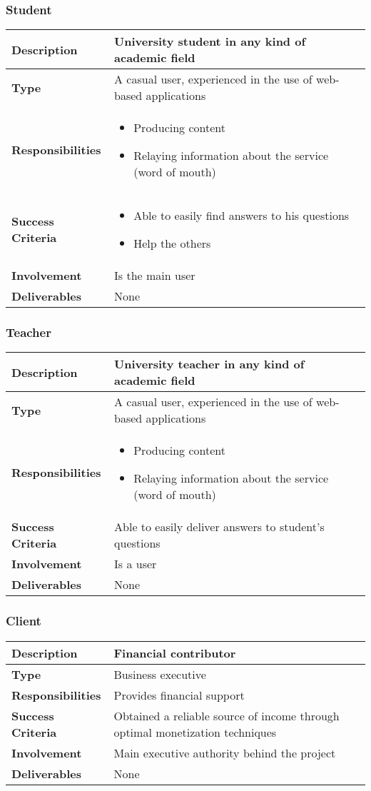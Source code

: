 \documentclass [a4paper, 11pt]{article}
\begin{document}
\subsubsection{Student}
\begin{tabular}{| >{\bfseries} M{85pt} | M{250pt} |}
	\hline
	Description & University student in any kind of academic field \tabularnewline
	\hline
	Type & A casual user, experienced in the use of web-based applications \tabularnewline
	\hline
	Responsibilities &
	\begin{itemize}
		\item Producing content
		\item Relaying information about the service (word of mouth)
	\end{itemize} \tabularnewline
	\hline
	Success Criteria &
	\begin{itemize}
		\item Able to easily find answers to his questions
		\item Help the others
	\end{itemize} \tabularnewline
	\hline
	Involvement & Is the main user \tabularnewline
	\hline
	Deliverables & None \tabularnewline
	\hline
\end{tabular}

\subsubsection{Teacher}
\begin{tabular}{| >{\bfseries} M{85pt} | M{250pt} |}
	\hline
	Description & University teacher in any kind of academic field \tabularnewline
	\hline
	Type & A casual user, experienced in the use of web-based applications \tabularnewline
	\hline
	Responsibilities &
	\begin{itemize}
		\item Producing content
		\item Relaying information about the service (word of mouth)
	\end{itemize} \tabularnewline
	\hline
	Success Criteria & Able to easily deliver answers to student's questions \tabularnewline
	\hline
	Involvement & Is a user \tabularnewline
	\hline
	Deliverables & None \tabularnewline
	\hline
\end{tabular}

\subsubsection{Client}
\begin{tabular}{| >{\bfseries} M{85pt} | M{250pt} |}
	\hline
	Description & Financial contributor \tabularnewline
	\hline
	Type & Business executive \tabularnewline
	\hline
	Responsibilities & Provides financial support \tabularnewline
	\hline
	Success Criteria & Obtained a reliable source of income through optimal monetization techniques \tabularnewline
	\hline
	Involvement & Main executive authority behind the project \tabularnewline
	\hline
	Deliverables & None \tabularnewline
	\hline
\end{tabular}
\end{document}
